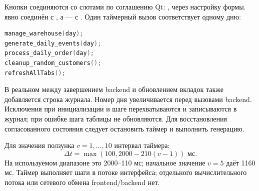 Кнопки соединяются со слотами по соглашению Qt:
, через настройку формы.
 явно соединён с , а
 --- с .
Один таймерный вызов соответствует одному дню:
\begin{lstlisting}[language=C++]
manage_warehouse(day);
generate_daily_events(day);
process_daily_order(day);
cleanup_random_customers();
refreshAllTabs();
\end{lstlisting}
В реальном  между завершением backend и обновлением вкладок
также добавляется строка журнала. Номер дня увеличивается перед вызовами
backend. Исключения при инициализации и шаге перехватываются и записываются
в журнал; при ошибке шага таблицы не обновляются. Для восстановления
согласованного состояния следует остановить таймер и выполнить генерацию.

Для значения ползунка $v=1,\ldots,10$ интервал таймера:
\begin{equation}
  \Delta t=\max(100,2000-210(v-1))\text{ мс}.
\end{equation}
На используемом диапазоне это 2000--110 мс; начальное значение $v=5$
даёт 1160 мс. Таймер выполняет шаги в потоке интерфейса; отдельного
вычислительного потока или сетевого обмена frontend/backend нет.

